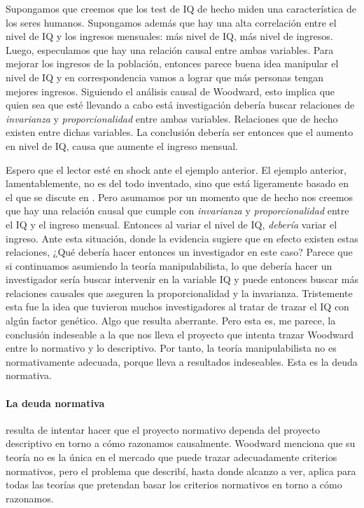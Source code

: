 Supongamos que creemos que los test de IQ de hecho miden una
característica de los seres humanos. Supongamos además que
hay una alta correlación entre el nivel de IQ y los ingresos
mensuales: más nivel de IQ, más nivel de ingresos. Luego,
especulamos que hay una relación causal entre ambas
variables. Para mejorar los ingresos de la población,
entonces parece buena idea manipular el nivel de IQ y en
correspondencia vamos a lograr que más personas tengan
mejores ingresos. Siguiendo el análisis causal de Woodward,
esto implica que quien sea que esté llevando a cabo está
investigación debería buscar relaciones de
\emph{invarianza} y \emph{proporcionalidad} entre ambas
variables. Relaciones que de hecho existen entre dichas
variables. La conclusión debería ser entonces que el aumento
en nivel de IQ, causa que aumente el ingreso mensual.   

Espero que el lector esté en shock ante el ejemplo anterior.
El ejemplo anterior, lamentablemente, no es del todo
inventado, sino que está ligeramente basado en el que se
discute en \parencite{Lewontin2017}. Pero asumamos por un
momento que de hecho nos creemos que hay una relación causal
que cumple con \emph{invarianza} y \emph{proporcionalidad}
entre el IQ y el ingreso mensual. Entonces al variar el
nivel de IQ, \emph{debería} variar el ingreso. Ante esta
situación, donde la evidencia sugiere que en efecto existen
estas relaciones, ¿Qué debería hacer entonces un
investigador en este caso? Parece que si continuamos
asumiendo la teoría manipulabilista, lo que debería hacer un
investigador sería buscar intervenir en la variable IQ y
puede entonces buscar más relaciones causales que aseguren
la proporcionalidad y la invarianza. Tristemente esta fue la
idea que tuvieron muchos investigadores al tratar de trazar
el IQ con algún factor genético. Algo que resulta aberrante.
Pero esta es, me parece, la conclusión indeseable a la que
nos lleva el proyecto que intenta trazar Woodward entre lo
normativo y lo descriptivo. Por tanto, la teoría
manipulabilista no es normativamente adecuada, porque lleva
a resultados indeseables. Esta es la deuda normativa.


\paragraph{La deuda normativa} resulta de intentar hacer que
el proyecto normativo dependa del proyecto descriptivo en
torno a cómo razonamos causalmente. Woodward menciona que su
teoría no es la única en el mercado que puede trazar
adecuadamente criterios normativos, pero el problema que
describí, hasta donde alcanzo a ver, aplica para todas las
teorías que pretendan basar los criterios normativos en
torno a cómo razonamos. 

